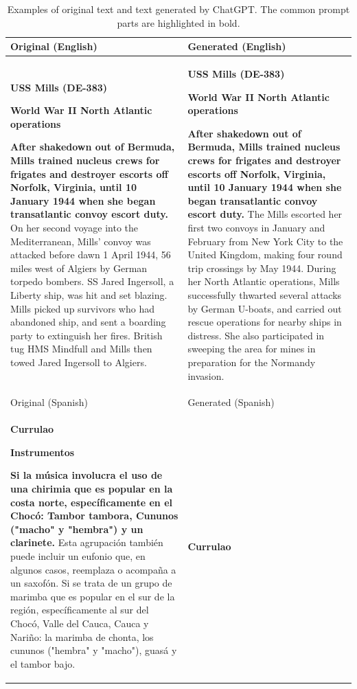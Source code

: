 \documentclass{article}
\begin{document}
\begin{table}
    \centering
    \caption{Examples of original text and text generated by ChatGPT. The common prompt parts are highlighted in bold.}\label{tbl:gen}
    \begin{tabular}{p{}p{}}
    \toprule
    Original (English) & Generated (English) \\
    \midrule




    

    \textbf{USS Mills (DE-383)}
    
    \textbf{World War II North Atlantic operations}
    
    \textbf{After shakedown out of Bermuda, Mills trained nucleus crews for frigates and destroyer escorts off Norfolk, Virginia, until 10 January 1944 when she began transatlantic convoy escort duty.} On her second voyage into the Mediterranean, Mills’ convoy was attacked before dawn 1 April 1944, 56 miles west of Algiers by German torpedo bombers. SS Jared Ingersoll, a Liberty ship, was hit and set blazing. Mills picked up survivors who had abandoned ship, and sent a boarding party to extinguish her fires. British tug HMS Mindfull and Mills then towed Jared Ingersoll to Algiers.
    &
    \textbf{USS Mills (DE-383)}

     \textbf{World War II North Atlantic operations}

    \textbf{After shakedown out of Bermuda, Mills trained nucleus crews for frigates and destroyer escorts off Norfolk, Virginia, until 10 January 1944 when she began transatlantic convoy escort duty.} The Mills escorted her first two convoys in January and February from New York City to the United Kingdom, making four round trip crossings by May 1944. During her North Atlantic operations, Mills successfully thwarted several attacks by German U-boats, and carried out rescue operations for nearby ships in distress. She also participated in sweeping the area for mines in preparation for the Normandy invasion.\\
    \midrule
    Original (Spanish) & Generated (Spanish) \\
    \midrule
    \textbf{Currulao}

    \textbf{Instrumentos}

    \textbf{Si la música involucra el uso de una chirimia que es popular en la costa norte, específicamente en el Chocó: Tambor tambora, Cununos ("macho" y "hembra") y un clarinete.} Esta agrupación también puede incluir un eufonio que, en algunos casos, reemplaza o acompaña a un saxofón. 
    Si se trata de un grupo de marimba que es popular en el sur de la región, específicamente al sur del Chocó, Valle del Cauca, Cauca y Nariño: la marimba de chonta, los cununos ("hembra" y "macho"), guasá y el tambor bajo.
    &
    \textbf{Currulao}


\end{tabular}
\end{table}
\end{document}
